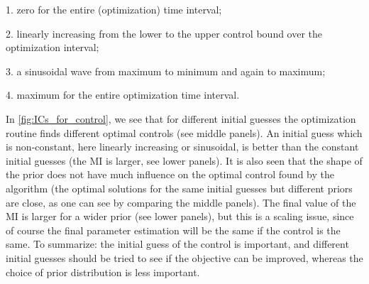 \documentclass[12pt]{article}
\begin{document}
1. zero for the entire (optimization) time interval;

2. linearly increasing from the lower to the upper control bound over the
optimization interval;

3. a sinusoidal wave from maximum to minimum and again to maximum;

4. maximum for the entire optimization time interval.

In \cref{fig:ICs_for_control}, we see that for different initial guesses the
optimization routine finds different optimal controls (see middle panels).  An
initial guess which is non-constant, here linearly increasing or
sinusoidal, is better than the constant initial guesses (the MI is larger, see lower panels). It is also
seen that the shape of the prior does not have much influence on the 
optimal control found by the algorithm (the optimal solutions for the same initial guesses but
different priors are close, as one can see by comparing the middle panels). The final value of
the MI is larger 
for a wider prior (see lower panels), but this is a scaling issue, since of course the
final parameter estimation will be the same if the control is the
same. To summarize: the initial guess of the control is important, and
different initial guesses should be tried to see if the objective can
be improved, whereas the choice of prior distribution is less
important.  
\end{document}

